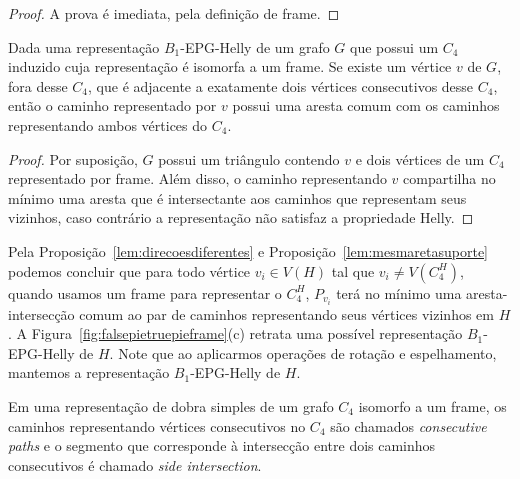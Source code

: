 \begin{proof}
A prova é imediata, pela definição de frame.
 \end{proof}

\begin{proposition}\label{lem:mesmaretasuporte}
Dada uma representação $B_1$-EPG-Helly de um grafo $G$ que possui um $C_4$ induzido cuja representação é isomorfa a um frame. Se existe um vértice $v$ de $G$, fora desse $C_4$, que é adjacente a exatamente dois vértices consecutivos desse $C_4$, então o caminho representado por  $v$ possui uma aresta comum com os caminhos representando ambos vértices do $C_4$.%
\end{proposition}

\begin{proof}
Por suposição, $G$ possui um triângulo contendo  $v$ e dois vértices de um $C_4$ representado por frame. Além disso, o caminho representando  $v$ compartilha no mínimo uma aresta que é intersectante aos caminhos que representam seus vizinhos, caso contrário a representação não satisfaz a propriedade Helly.
 \end{proof}


Pela Proposição~\ref{lem:direcoesdiferentes} e Proposição~\ref{lem:mesmaretasuporte} podemos concluir que para todo vértice   $v_i \in V(H)$ tal que $v_i \neq V(C_4^{H})$, quando usamos um frame para representar o $C_4^{H}$, $P_{v_i}$ terá no mínimo uma aresta-intersecção comum ao par de caminhos representando seus vértices vizinhos em $H$. 
A Figura~\ref{fig:falsepietruepieframe}(c) retrata uma possível representação $B_{1}$-EPG-Helly de $H$. 
Note que ao aplicarmos operações de rotação e espelhamento, mantemos a representação $B_1$-EPG-Helly de $H$.

\begin{definition}
Em uma representação de dobra simples de um grafo  $C_4$ isomorfo a um frame, os caminhos representando vértices consecutivos no  $C_4$ são chamados \emph{consecutive paths} e o segmento que corresponde à intersecção entre dois caminhos consecutivos é chamado \emph{side intersection}.  
\end{definition}

